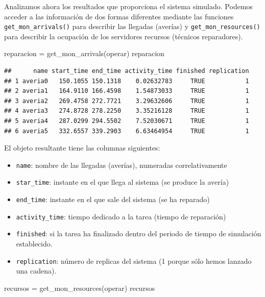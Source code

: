 \documentclass[
]{book}
\newenvironment{Shaded}{\begin{snugshade}}{\end{snugshade}}
\newcommand{\FunctionTok}[1]{\textcolor[rgb]{0.00,0.00,0.00}{#1}}
\newcommand{\NormalTok}[1]{#1}
\newcommand{\OtherTok}[1]{\textcolor[rgb]{0.56,0.35,0.01}{#1}}
\providecommand{\tightlist}{%
  \setlength{\itemsep}{0pt}\setlength{\parskip}{0pt}}
\theoremstyle{definition}
\theoremstyle{definition}
\theoremstyle{definition}
\theoremstyle{definition}
\theoremstyle{remark}
\begin{document}
Analizamos ahora los resultados que proporciona el sistema simulado. Podemos acceder a las información de dos formas diferentes mediante las funciones \texttt{get\_mon\_arrivals()} para describir las llegadas (averías) y \texttt{get\_mon\_resources()} para describir la ocupación de los servidores recursos (técnicos reparadores).

\begin{Shaded}
\begin{Highlighting}[]
\NormalTok{reparacion }\OtherTok{=} \FunctionTok{get\_mon\_arrivals}\NormalTok{(operar)}
\NormalTok{reparacion}
\end{Highlighting}
\end{Shaded}

\begin{verbatim}
##      name start_time end_time activity_time finished replication
## 1 averia0   150.1055 150.1318    0.02632783     TRUE           1
## 2 averia1   164.9110 166.4598    1.54873033     TRUE           1
## 3 averia2   269.4758 272.7721    3.29632606     TRUE           1
## 4 averia3   274.8728 278.2250    3.35216128     TRUE           1
## 5 averia4   287.0299 294.5502    7.52030671     TRUE           1
## 6 averia5   332.6557 339.2903    6.63464954     TRUE           1
\end{verbatim}

El objeto resultante tiene las columnas siguientes:

\begin{itemize}
\tightlist
\item
  \texttt{name}: nombre de las llegadas (averías), numeradas correlativamente
\item
  \texttt{star\_time}: instante en el que llega al sistema (se produce la avería)
\item
  \texttt{end\_time}: instante en el que sale del sistema (se ha reparado)
\item
  \texttt{activity\_time}: tiempo dedicado a la tarea (tiempo de reparación)
\item
  \texttt{finished}: si la tarea ha finalizado dentro del periodo de tiempo de simulación establecido.
\item
  \texttt{replication}: número de replicas del sistema (1 porque sólo hemos lanzado una cadena).
\end{itemize}

\begin{Shaded}
\begin{Highlighting}[]
\NormalTok{recursos }\OtherTok{=} \FunctionTok{get\_mon\_resources}\NormalTok{(operar)}
\NormalTok{recursos}
\end{Highlighting}
\end{Shaded}
\end{document}
